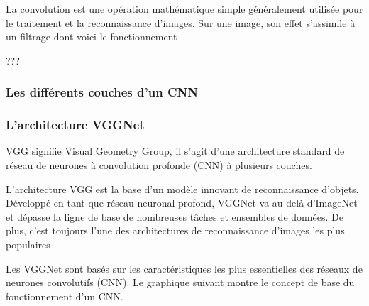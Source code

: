 	La convolution est une opération mathématique simple généralement utilisée pour le traitement et la reconnaissance d’images. Sur une image, son effet s’assimile à un filtrage dont voici le fonctionnement
	
	???
	\lipsum[1]
	\subsubsection{Les différents couches d'un CNN}
	\lipsum[1]
	\subsubsection{L'architecture VGGNet}
	
	VGG signifie Visual Geometry Group, il s'agit d'une architecture standard de réseau de neurones à convolution profonde (CNN) à plusieurs couches. %
	
	
	
	L'architecture VGG est  la base d'un modèle innovant de reconnaissance d'objets. Développé en tant que réseau neuronal profond, VGGNet va au-delà d'ImageNet et dépasse la ligne de base  de nombreuses tâches et ensembles de données. De plus, c'est toujours l'une des architectures de reconnaissance d'images les plus populaires \cite{tammina2019transfer, antoine2018apprentissage}.
	
	Les VGGNet sont basés sur les caractéristiques les plus essentielles des réseaux de neurones convolutifs (CNN). Le graphique suivant montre le concept de base du fonctionnement d'un CNN.
	
